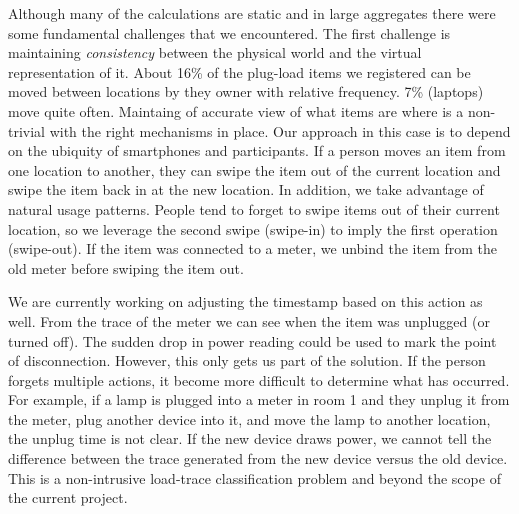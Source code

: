 Although many of the calculations are static and in large aggregates there were some fundamental challenges that
we encountered.  The first challenge is maintaining \emph{consistency} between the physical world and the virtual
representation of it.  About 16\% of the plug-load items we registered can be moved between locations by they owner
with relative frequency.  7\% (laptops) move quite often.  Maintaing of accurate view of what items are where
is a non-trivial with the right mechanisms in place.  Our approach in this case is to depend on the ubiquity of
smartphones and participants.  If a person moves an item from one location to another, they can swipe the item out
of the current location and swipe the item back in at the new location.  In addition, we take advantage of
natural usage patterns.  People tend to forget to swipe items out of their current location, so we leverage the
second swipe (swipe-in) to imply the first operation (swipe-out).  If the item was connected to a meter, we unbind the item
from the old meter before swiping the item out.  

We are currently working on adjusting the timestamp based on this action as well.
From the trace of the meter we can see when the item was unplugged (or turned off).  The sudden drop in power
reading could be used to mark the point of disconnection.  However, this only gets us part of the solution.  If the person
forgets multiple actions, it become more difficult to determine what has occurred.  For example, if a lamp is plugged
into a meter in room 1 and they unplug it from the meter, plug another device into it, and move the lamp to
another location, the unplug time is not clear.  If the new device draws power, we cannot tell the difference between
the trace generated from the new device versus the old device.  This is a non-intrusive load-trace classification
problem and beyond the scope of the current project.

